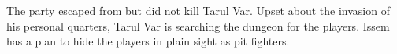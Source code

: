 The party escaped from but did not kill Tarul Var.
Upset about the invasion of his personal quarters, Tarul Var is searching the dungeon for the players.
Issem has a plan to hide the players in plain sight as pit fighters.